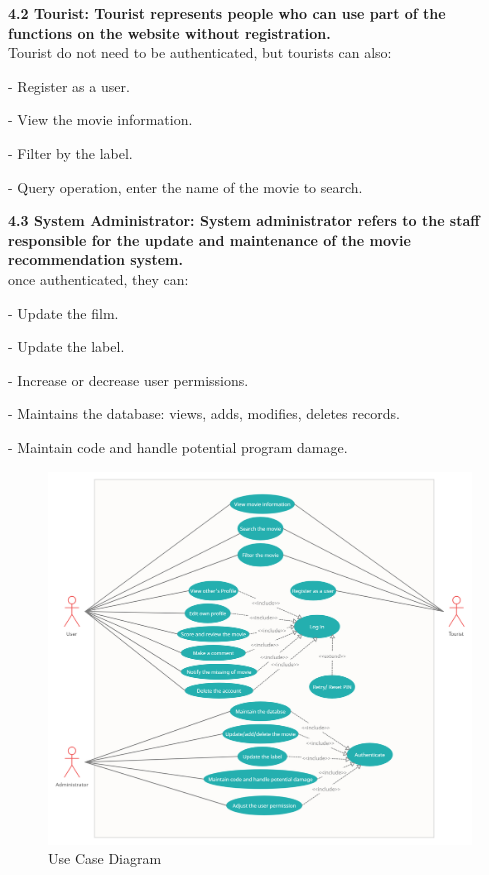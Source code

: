 \documentclass[10pt]{article}
\begin{document}
\noindent \textbf{4.2 Tourist: Tourist represents people who can use part of the functions on the website without registration.\\}
Tourist do not need to be authenticated, but tourists can also:
\begin{itemize}
\begin{multicols}{2}
\item[-] Register as a user.
\item[-] View the movie information.
\item[-] Filter by the label.
\item[-] Query operation, enter the name of the movie to search.
\end{multicols}
\end{itemize}

\noindent \textbf{4.3 System Administrator: System administrator refers to the staff responsible for the update and maintenance of the movie recommendation system.\\}
once authenticated, they can:
\begin{itemize}
\begin{multicols}{2}
\item[-] Update the film.
\item[-] Update the label.
\item[-] Increase or decrease user permissions.
\item[-] Maintains the database: views, adds, modifies, deletes records.
\item[-] Maintain code and handle potential program damage.

\end{multicols}
\end{itemize}

\begin{figure}[H]
\centering
\includegraphics[scale =0.188]{UCD.png}
\caption{Use Case Diagram}
\label{fig:image}
\end{figure}
\end{document}

